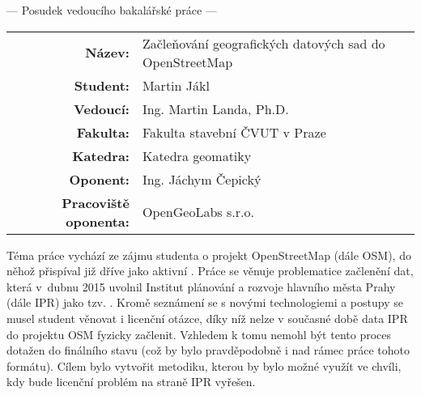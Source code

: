 \documentclass[czech,11pt,a4paper]{article}
\begin{document}
\begin{center}
  {\Large --- Posudek vedoucího bakalářské práce ---}
\end{center}

\vspace{.2cm}

\noindent \begin{tabular}{rp{}}
  {\bf Název:} & Začleňování geografických datových sad do OpenStreetMap \\
  {\bf Student:} & Martin Jákl \\
  {\bf Vedoucí:} & Ing. Martin Landa, Ph.D. \\
  {\bf Fakulta:} & Fakulta stavební ČVUT v Praze \\ 
  {\bf Katedra:} & Katedra geomatiky \\
  {\bf Oponent:} & Ing. Jáchym Čepický \\
  {\bf Pracoviště oponenta:} & OpenGeoLabs s.r.o. \\
\end{tabular}

\vspace{1cm}

Téma práce vychází ze zájmu studenta o projekt OpenStreetMap (dále
OSM), do něhož přispíval již dříve jako aktivní . Práce se
věnuje problematice začlenění dat, která v~dubnu 2015 uvolnil Institut
plánování a rozvoje hlavního města Prahy (dále IPR) jako
tzv. . Kromě seznámení se s novými technologiemi a
postupy se musel student věnovat i licenční otázce, díky níž nelze v
současné době data IPR do projektu OSM fyzicky začlenit. Vzhledem k
tomu nemohl být tento proces dotažen do finálního stavu (což by bylo
pravděpodobně i nad rámec práce tohoto formátu). Cílem bylo vytvořit
metodiku, kterou by bylo možné využít ve chvíli, kdy bude licenční
problém na straně IPR vyřešen. \newline
\end{document}

